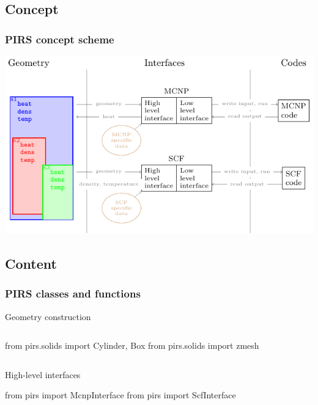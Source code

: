 \subsection{Concept}
\begin{frame}[fragile]
    \frametitle{PIRS concept scheme}
    \includegraphics[width=\textwidth]{scheme_wrapper.pdf}
\end{frame}



\subsection{Content}
\begin{frame}[fragile]
    \frametitle{PIRS classes and functions}

    \begin{block}{Geometry construction}
    \begin{columns}
        \begin{pythoncode}
            from pirs.solids import Cylinder, Box
            from pirs.solids import zmesh
        \end{pythoncode}
    \end{columns}
    \end{block}

    \begin{block}{High-level interfaces}
        \begin{pythoncode}
            from pirs import McnpInterface
            from pirs import ScfInterface
        \end{pythoncode}
    \end{block}
\end{frame}



